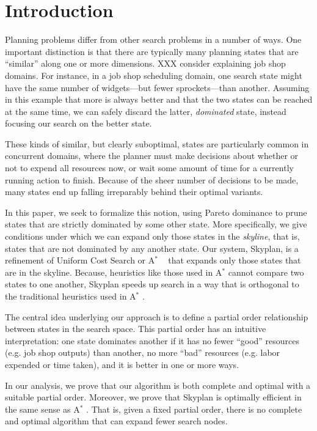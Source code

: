 \documentclass[letterpaper]{article}
\theoremstyle{plain} \newtheorem{theorem}{Theorem} \newtheorem{proposition}{Proposition} \newtheorem{lemma}{Lemma}
\theoremstyle{definition} \newtheorem{definition}{Definition} \newtheorem{conjecture}{Conjecture} \newtheorem*{example}{Example}
\theoremstyle{remark} \newtheorem*{remark}{Remark} \newtheorem*{note}{Note} \newtheorem{case}{Case}
\newcommand{\Astar}{A$^*$ }
\begin{document}
\section{Introduction}

Planning problems differ from other search problems in a number of
ways. One important distinction is that there are typically many
planning states that are ``similar'' along one or more dimensions.
XXX consider explaining job shop domains.
For instance, in a job shop scheduling domain, one search state
might have the same number of widgets---but fewer sprockets---than
another. Assuming in this example that more is always better and that the two states
can be reached at the same time, we can safely discard the latter,
\textit{dominated} state, instead focusing our search on the better
state.

These kinds of similar, but clearly suboptimal, states are particularly
common in concurrent domains, where the planner must make decisions
about whether or not to expend all resources now, or wait some
amount of time for a currently running action to finish. Because
of the sheer number of decisions to be made, many states
end up falling irreparably behind their optimal variants.

In this paper, we seek to formalize this notion, using Pareto
dominance to prune states that are strictly dominated by some other
state. More specifically, we give conditions under which we can
expand only those states in the \textit{skyline}, that is, states
that are not dominated by any another state. Our system, Skyplan,
is a refinement of Uniform Cost Search or \Astar~\citep{astar} that
expands only those states that are in the skyline. Because, heuristics like
those used in \Astar cannot compare two states to one another, Skyplan
speeds up search in a way that is orthogonal to the traditional heuristics used in \Astar.

The central idea underlying our approach is to define a partial
order relationship between states in the search space. This partial
order has an intuitive interpretation: one state dominates another
if it has no fewer ``good'' resources (e.g. job shop outputs) than
another, no more ``bad'' resources (e.g. labor expended or time
taken), and it is better in one or more ways. 


In our analysis, we prove that our algorithm is both complete and
optimal with a suitable partial order. Moreover, we prove that
Skyplan is optimally efficient in the same sense as \Astar. That
is, given a fixed partial order, there is no complete and optimal
algorithm that can expand fewer search nodes.
\end{document}
